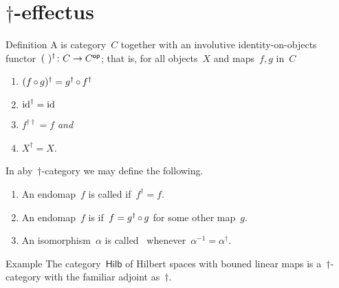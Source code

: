 \documentclass[b]{subfiles}
\begin{document}
\section{$\dagger$-effectus}
\begin{parsec}%
\begin{point}{Definition}%
A  
is category~$C$ together with an involutive identity-on-objects
    functor~$(\ )^\dagger \colon C \to {C}{^{\mathsf{op}}}$;
    that is, for all objects~$X$ and maps~$f,g$ in~$C$
\begin{multicols}{2}
\begin{enumerate}
    \item $(f \mathop{\circ} g)^\dagger = g^\dagger \mathop{\circ} f^\dagger$
    \item $\operatorname{id}^\dagger = \operatorname{id}$
    \item $f^{\dagger\dagger} = f$ \emph{and}
    \item $X^\dagger = X$.
\end{enumerate}
\end{multicols}
\noindent
In aby~$\dagger$-category we may define the following.
\begin{enumerate}
\item
    An endomap~$f$ is called 
    if~$f^\dagger = f$.
\item
    An endomap~$f$ is 
    if~$f = g^\dagger \mathop{\circ} g$ for some other map~$g$.
\item
    An isomorphism~$\alpha$ is called~
        whenever~$\alpha^{-1} = \alpha^\dagger$.
\end{enumerate}
\end{point}
\begin{point}{Example}%
The category~$\mathsf{Hilb}$
    of Hilbert spaces with bouned linear maps
    is a~$\dagger$-category
    with the familiar adjoint as~$\dagger$.
\end{point}
\end{parsec}
\end{document}
